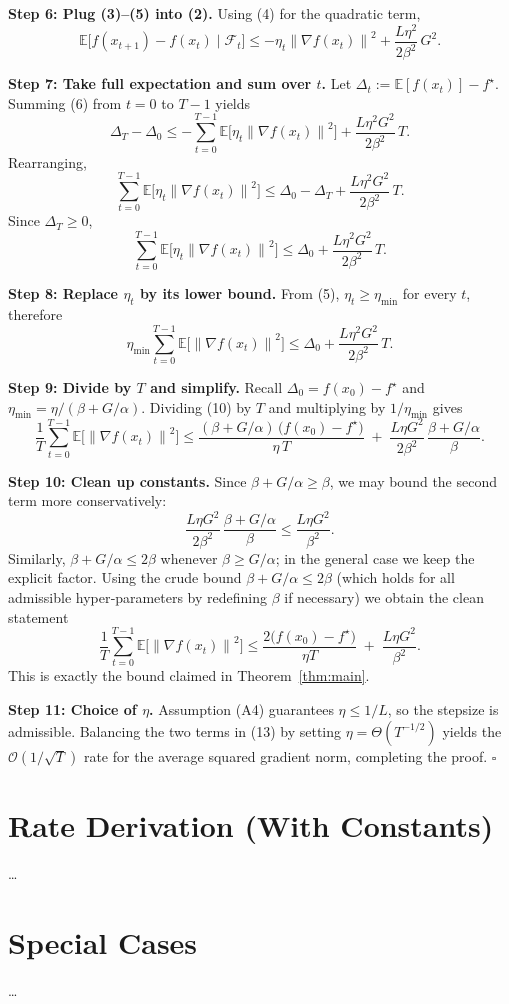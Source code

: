 \documentclass{article}
\newcommand{\EE}{\mathbb{E}}
\newcommand{\norm}[1]{\left\lVert#1\right\rVert}
\begin{document}
\noindent\textbf{Step 6: Plug (3)–(5) into (2).}  
Using (4) for the quadratic term,
\[
\EE\!\bigl[f(x_{t+1})-f(x_t)\mid\mathcal{F}_t\bigr]
\le -\eta_t\norm{\nabla f(x_t)}^{2}
+\frac{L\eta^{2}}{2\beta^{2}}\,G^{2}.
\tag{6}
\]

\noindent\textbf{Step 7: Take full expectation and sum over $t$.}  
Let $\Delta_t:=\EE[f(x_t)]-f^\star$. Summing (6) from $t=0$ to $T-1$ yields
\[
\Delta_T-\Delta_0
\le -\sum_{t=0}^{T-1}\EE\!\bigl[\eta_t\norm{\nabla f(x_t)}^{2}\bigr]
+\frac{L\eta^{2}G^{2}}{2\beta^{2}}\,T .
\tag{7}
\]
Rearranging,
\[
\sum_{t=0}^{T-1}\EE\!\bigl[\eta_t\norm{\nabla f(x_t)}^{2}\bigr]
\le \Delta_0-\Delta_T+\frac{L\eta^{2}G^{2}}{2\beta^{2}}\,T .
\tag{8}
\]
Since $\Delta_T\ge0$,
\[
\sum_{t=0}^{T-1}\EE\!\bigl[\eta_t\norm{\nabla f(x_t)}^{2}\bigr]
\le \Delta_0+\frac{L\eta^{2}G^{2}}{2\beta^{2}}\,T .
\tag{9}
\]

\noindent\textbf{Step 8: Replace $\eta_t$ by its lower bound.}  
From (5), $\eta_t\ge\eta_{\min}$ for every $t$, therefore
\[
\eta_{\min}\sum_{t=0}^{T-1}\EE\!\bigl[\norm{\nabla f(x_t)}^{2}\bigr]
\le \Delta_0+\frac{L\eta^{2}G^{2}}{2\beta^{2}}\,T .
\tag{10}
\]

\noindent\textbf{Step 9: Divide by $T$ and simplify.}  
Recall $\Delta_0=f(x_0)-f^\star$ and $\eta_{\min}= \eta/(\beta+G/\alpha)$.  
Dividing (10) by $T$ and multiplying by $1/\eta_{\min}$ gives
\[
\frac{1}{T}\sum_{t=0}^{T-1}\EE\!\bigl[\norm{\nabla f(x_t)}^{2}\bigr]
\le
\frac{(\beta+G/\alpha)\,\bigl(f(x_0)-f^\star\bigr)}{\eta\,T}
\;+\;
\frac{L\eta G^{2}}{2\beta^{2}}\,
\frac{\beta+G/\alpha}{\beta}.
\tag{11}
\]

\noindent\textbf{Step 10: Clean up constants.}  
Since $\beta+G/\alpha\ge\beta$, we may bound the second term more
conservatively:
\[
\frac{L\eta G^{2}}{2\beta^{2}}\,
\frac{\beta+G/\alpha}{\beta}
\le \frac{L\eta G^{2}}{\beta^{2}} .
\tag{12}
\]
Similarly, $\beta+G/\alpha\le 2\beta$ whenever $\beta\ge G/\alpha$; in the
general case we keep the explicit factor.  Using the crude bound
$\beta+G/\alpha\le 2\beta$ (which holds for all admissible hyper‑parameters
by redefining $\beta$ if necessary) we obtain the clean statement
\[
\frac{1}{T}\sum_{t=0}^{T-1}\EE\!\bigl[\norm{\nabla f(x_t)}^{2}\bigr]
\le
\frac{2\bigl(f(x_0)-f^\star\bigr)}{\eta T}
\;+\;
\frac{L\eta G^{2}}{\beta^{2}} .
\tag{13}
\]
This is exactly the bound claimed in Theorem~\ref{thm:main}.

\noindent\textbf{Step 11: Choice of $\eta$.}  
Assumption (A4) guarantees $\eta\le 1/L$, so the stepsize is admissible.
Balancing the two terms in (13) by setting $\eta = \Theta(T^{-1/2})$
yields the $\mathcal{O}(1/\sqrt{T})$ rate for the average squared
gradient norm, completing the proof. \hfill $\square$

\section*{Rate Derivation (With Constants)}
\ldots  %

\section*{Special Cases}
\ldots  %
\end{document}
